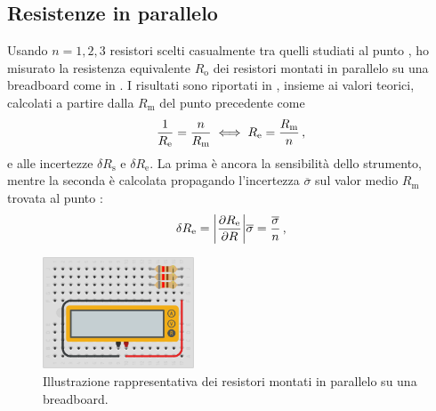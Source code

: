         \subsection{Resistenze in parallelo}
            Usando $n = 1, 2, 3$ resistori scelti casualmente tra quelli studiati al punto , ho misurato la resistenza equivalente $R_\text{o}$ dei resistori montati in parallelo su una breadboard come in . I risultati sono riportati in , insieme ai valori teorici, calcolati a partire dalla $R_\text{m}$ del punto precedente come
            \begin{equation*}
                \frac{1}{R_\text{e}}
                = \frac{n}{R_\text{m}}
                \iff R_\text{e} = \frac{R_\text{m}}{n}
                \,,
            \end{equation*}
            e alle incertezze $\delta R_\text{s}$ e $\delta R_\text{e}$. La prima è ancora la sensibilità dello strumento, mentre la seconda è calcolata propagando l'incertezza $\overline{\sigma}$ sul valor medio $R_\text{m}$ trovata al punto :
            \begin{equation*}
                \delta R_\text{e}
                = \abs{\pdv{R_\text{e}}{R}}\overline{\sigma}
                = \frac{\overline{\sigma}}{n}
                \,,
            \end{equation*}
            \begin{figure}
                \centering
                \includegraphics[width=0.4\textwidth]{images/multimetro/res-parallelo.png}
                \caption{Illustrazione rappresentativa dei resistori montati in parallelo su una breadboard.}
                \label{fig:mul:res-parallelo}
            \end{figure}
            \begin{table}
                \centering
                
                \caption{Resistenze equivalenti misurate su resistori in parallelo e relative incertezze. Tutti i valori sono espressi in \unit{\ohm}.}
                \label{tab:mul:res-parallelo}
            \end{table}

